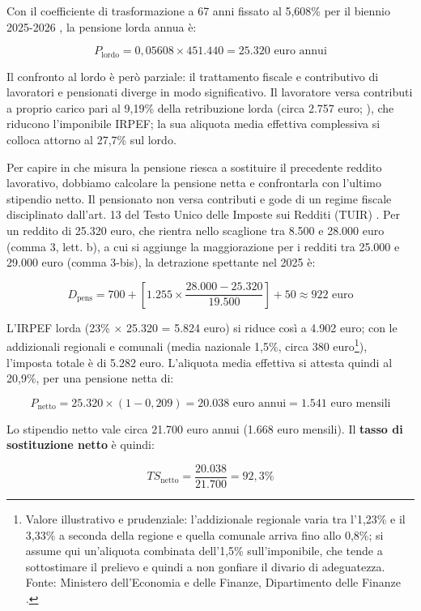 Con il coefficiente di trasformazione a 67 anni fissato al 5,608\% per il
biennio 2025-2026 \cite{MEF_RGS2025}, la pensione lorda annua è:

\[
P_{\text{lordo}} = 0{,}05608 \times 451.440 = 25.320 \text{ euro annui}
\]

Il confronto al lordo è però parziale: il trattamento fiscale e contributivo
di lavoratori e pensionati diverge in modo significativo. Il lavoratore versa
contributi a proprio carico pari al 9,19\% della retribuzione lorda (circa
2.757 euro; \citealp{INPSAliquote2023}), che riducono l'imponibile IRPEF; la sua aliquota media effettiva
complessiva si colloca attorno al 27,7\% sul lordo. 

Per capire in che misura la pensione riesca a sostituire il precedente reddito lavorativo, dobbiamo calcolare la pensione netta e confrontarla con l'ultimo stipendio netto. Il pensionato non versa contributi e gode di un regime fiscale disciplinato dall'art. 13 del Testo Unico delle Imposte sui Redditi (TUIR) \cite{TUIR917_1986}. Per un reddito di 25.320 euro, che rientra nello scaglione tra 8.500 e 28.000 euro (comma 3, lett. b), a cui si aggiunge la maggiorazione per i redditi tra 25.000 e 29.000 euro (comma 3-bis), la detrazione spettante nel 2025 è:

\[
D_{\text{pens}} = 700 + \left[ 1.255 \times \frac{28.000 - 25.320}{19.500} \right] + 50 \approx 922 \text{ euro}
\]

L'IRPEF lorda (23\% $\times$ 25.320 = 5.824 euro) si riduce così a 4.902 euro;
con le addizionali regionali e comunali (media nazionale 1,5\%, circa 380 euro\footnote{Valore illustrativo e prudenziale: l'addizionale regionale varia tra l'1,23\% e il 3,33\% a seconda della regione e quella comunale arriva fino allo 0,8\%; si assume qui un'aliquota combinata dell'1,5\% sull'imponibile, che tende a sottostimare il prelievo e quindi a non gonfiare il divario di adeguatezza. Fonte: Ministero dell'Economia e delle Finanze, Dipartimento delle Finanze \cite{MEF_DF_Addizionali}.}), l'imposta totale è di 5.282 euro. L'aliquota media effettiva si attesta quindi al 20,9\%, per una pensione netta di:

\[
P_{\text{netto}} = 25.320 \times (1 - 0{,}209) = 20.038 \text{ euro annui}
= 1.541 \text{ euro mensili}
\]

Lo stipendio netto vale circa 21.700 euro annui (1.668 euro mensili). Il
\textbf{tasso di sostituzione netto} è quindi:

\[
TS_{\text{netto}} = \frac{20.038}{21.700} = 92{,}3\%
\]

